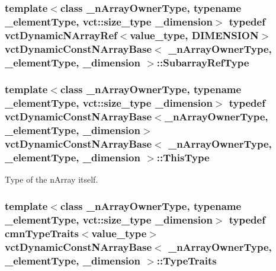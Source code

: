 \hypertarget{classvct_dynamic_const_n_array_base_a4db8630795191b1854a5af85b9327ee3}{
\subsubsection[{Subarray\-Ref\-Type}]{\setlength{\rightskip}{0pt plus 5cm}template$<$class \-\_\-n\-Array\-Owner\-Type, typename \-\_\-element\-Type, vct\-::size\-\_\-type \-\_\-dimension$>$ typedef {\bf vct\-Dynamic\-N\-Array\-Ref}$<$value\-\_\-type, {\bf D\-I\-M\-E\-N\-S\-I\-O\-N}$>$ {\bf vct\-Dynamic\-Const\-N\-Array\-Base}$<$ \-\_\-n\-Array\-Owner\-Type, \-\_\-element\-Type, \-\_\-dimension $>$\-::{\bf Subarray\-Ref\-Type}}}\label{classvct_dynamic_const_n_array_base_a4db8630795191b1854a5af85b9327ee3}
\hypertarget{classvct_dynamic_const_n_array_base_a5123caffcf1455a1b99003877eade897}{
\subsubsection[{This\-Type}]{\setlength{\rightskip}{0pt plus 5cm}template$<$class \-\_\-n\-Array\-Owner\-Type, typename \-\_\-element\-Type, vct\-::size\-\_\-type \-\_\-dimension$>$ typedef {\bf vct\-Dynamic\-Const\-N\-Array\-Base}$<$\-\_\-n\-Array\-Owner\-Type, \-\_\-element\-Type, \-\_\-dimension$>$ {\bf vct\-Dynamic\-Const\-N\-Array\-Base}$<$ \-\_\-n\-Array\-Owner\-Type, \-\_\-element\-Type, \-\_\-dimension $>$\-::{\bf This\-Type}}}\label{classvct_dynamic_const_n_array_base_a5123caffcf1455a1b99003877eade897}
Type of the n\-Array itself. \hypertarget{classvct_dynamic_const_n_array_base_ab1fc145860fe50454edfcfbe8347ccc1}{
\subsubsection[{Type\-Traits}]{\setlength{\rightskip}{0pt plus 5cm}template$<$class \-\_\-n\-Array\-Owner\-Type, typename \-\_\-element\-Type, vct\-::size\-\_\-type \-\_\-dimension$>$ typedef {\bf cmn\-Type\-Traits}$<$value\-\_\-type$>$ {\bf vct\-Dynamic\-Const\-N\-Array\-Base}$<$ \-\_\-n\-Array\-Owner\-Type, \-\_\-element\-Type, \-\_\-dimension $>$\-::{\bf Type\-Traits}}}\label{classvct_dynamic_const_n_array_base_ab1fc145860fe50454edfcfbe8347ccc1}


